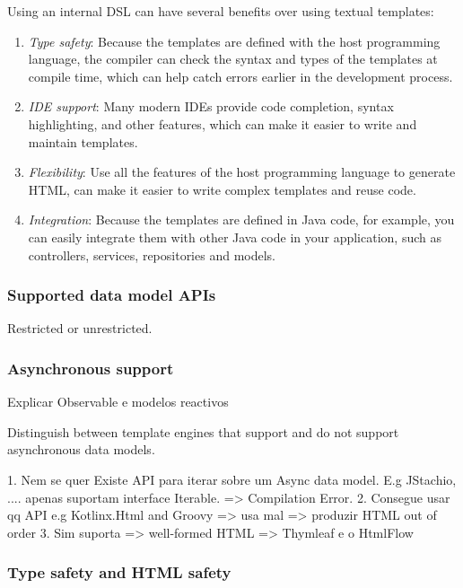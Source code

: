 Using an internal DSL can have several benefits over using textual templates:
\begin{enumerate}
  \item \emph{Type safety}: Because the templates are defined with the host
  programming language, the compiler can check the syntax and types of the
  templates at compile time, which can help catch errors earlier in the
  development process.

  \item \emph{IDE support}: Many modern IDEs provide code completion, syntax
  highlighting, and other features, which can make it easier to write and
  maintain templates.
  
  \item \emph{Flexibility}: Use all the features of the host programming language
  to generate HTML, can make it easier to write complex templates and reuse code.
  
  \item \emph{Integration}: Because the templates are defined in Java code, for
  example, you can easily integrate them with other Java code in your
  application, such as controllers, services, repositories and models.
  
\end{enumerate}

\subsubsection{Supported data model APIs}

Restricted or unrestricted.

\subsubsection{Asynchronous support}

Explicar Observable e modelos reactivos

Distinguish between template engines that support and do not support asynchronous data models.

1. Nem se quer Existe API para iterar sobre um Async data model. 
   E.g JStachio, .... apenas suportam interface Iterable. => Compilation Error.
2. Consegue usar qq API e.g Kotlinx.Html and Groovy  => usa mal => produzir HTML out of order
3. Sim suporta => well-formed HTML => Thymleaf e o HtmlFlow

\subsubsection{Type safety and HTML safety}

